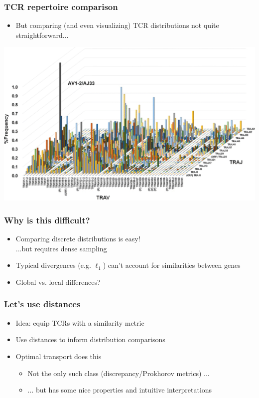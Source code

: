 \documentclass[mathserif,compress,xcolor={dvipsnames}]{beamer}
\renewcommand\;{\,}
\begin{document}
\begin{frame}\frametitle{TCR repertoire comparison}
\begin{itemize}
\bigskip
\item
But comparing (and even visualizing) TCR distributions not quite straightforward...
\end{itemize}
\begin{center}
\includegraphics[width=0.8\linewidth]{Images/TCRRepertoire.png}
\end{center}
\end{frame}


\begin{frame}\frametitle{Why is this difficult?}
\begin{itemize}
\item
Comparing discrete distributions is easy! \\ ...but requires dense sampling
\bigskip
\item
Typical divergences (e.g. $\ell_1$) can't account for similarities between genes
\bigskip
\item
Global vs. local differences?
\end{itemize}
\end{frame}


\begin{frame}\frametitle{Let's use distances}
\begin{itemize}
\item
Idea: equip TCRs with a similarity metric
\bigskip
\item
Use distances to inform distribution comparisons
\bigskip
\item
Optimal transport does this
\bigskip
\begin{itemize}
\item
Not the only such class (discrepancy/Prokhorov metrics) ...
\bigskip
\item
... but has some nice properties and intuitive interpretations
\end{itemize}
\end{itemize}
\end{frame}
\end{document}
